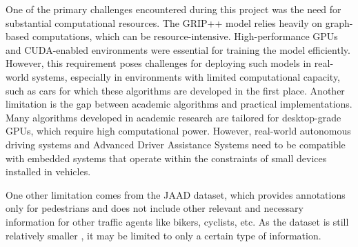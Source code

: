 \tab One of the primary challenges encountered during this project was the need for substantial computational resources. The GRIP++ model relies heavily on graph-based computations, which can be resource-intensive. High-performance GPUs and CUDA-enabled environments were essential for training the model efficiently. However, this requirement poses challenges for deploying such models in real-world systems, especially in environments with limited computational capacity, such as cars for which these algorithms are developed in the first place. Another limitation is the gap between academic algorithms and practical implementations. Many algorithms developed in academic research are tailored for desktop-grade GPUs, which require high computational power. However, real-world autonomous driving systems and Advanced Driver Assistance Systems need to be compatible with embedded systems that operate within the constraints of small devices installed in vehicles.

\tab One other limitation comes from the JAAD dataset, which provides annotations only for pedestrians and does not include other relevant and necessary information for other traffic agents like bikers, cyclists, etc. As the dataset is still relatively smaller \cite{rasouli2017ICCVW}, it may be limited to only a certain type of information.